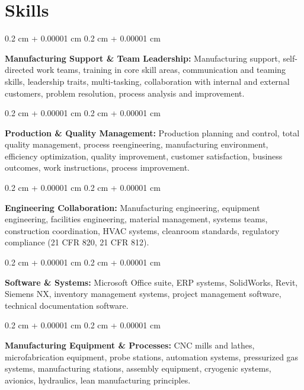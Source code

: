 \documentclass[10pt, letterpaper]{article}
\newenvironment{onecolentry}{
    \begin{adjustwidth}{
        0.2 cm + 0.00001 cm
    }{
        0.2 cm + 0.00001 cm
    }
}{
    \end{adjustwidth}
} %
\begin{document}
\vspace{0.4 cm}


    
    \section{Skills}

        \begin{onecolentry}
            \textbf{Manufacturing Support \& Team Leadership:} Manufacturing support, self-directed work teams, training in core skill areas, communication and teaming skills, leadership traits, multi-tasking, collaboration with internal and external customers, problem resolution, process analysis and improvement.
        \end{onecolentry}

        \vspace{0.2 cm}

        \begin{onecolentry}
            \textbf{Production \& Quality Management:} Production planning and control, total quality management, process reengineering, manufacturing environment, efficiency optimization, quality improvement, customer satisfaction, business outcomes, work instructions, process improvement.
        \end{onecolentry}

        \vspace{0.2 cm}

        \begin{onecolentry}
            \textbf{Engineering Collaboration:} Manufacturing engineering, equipment engineering, facilities engineering, material management, systems teams, construction coordination, HVAC systems, cleanroom standards, regulatory compliance (21 CFR 820, 21 CFR 812).
        \end{onecolentry}

        \vspace{0.2 cm}

        \begin{onecolentry}
            \textbf{Software \& Systems:} Microsoft Office suite, ERP systems, SolidWorks, Revit, Siemens NX, inventory management systems, project management software, technical documentation software.
        \end{onecolentry}

        \vspace{0.2 cm}

        \begin{onecolentry}
            \textbf{Manufacturing Equipment \& Processes:} CNC mills and lathes, microfabrication equipment, probe stations, automation systems, pressurized gas systems, manufacturing stations, assembly equipment, cryogenic systems, avionics, hydraulics, lean manufacturing principles.
        \end{onecolentry}


    
\end{document}
